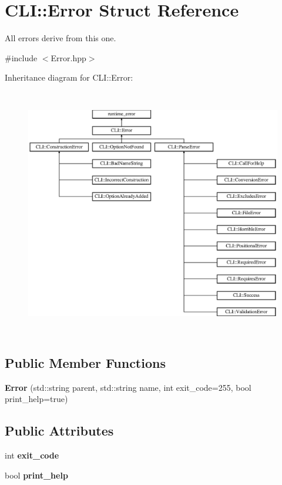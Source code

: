 \hypertarget{struct_c_l_i_1_1_error}{}\section{C\+LI\+:\+:Error Struct Reference}
\label{struct_c_l_i_1_1_error}


All errors derive from this one.  




{\ttfamily \#include $<$Error.\+hpp$>$}

Inheritance diagram for C\+LI\+:\+:Error\+:\begin{figure}[H]
\begin{center}
\leavevmode
\includegraphics[height=10.898204cm]{struct_c_l_i_1_1_error}
\end{center}
\end{figure}
\subsection*{Public Member Functions}
\begin{DoxyCompactItemize}
\item 
\mbox{\label{struct_c_l_i_1_1_error_a4a7d1df599d7b771bd46eb6f72221cc1}} 
{\bfseries Error} (std\+::string parent, std\+::string name, int exit\+\_\+code=255, bool print\+\_\+help=true)
\end{DoxyCompactItemize}
\subsection*{Public Attributes}
\begin{DoxyCompactItemize}
\item 
\mbox{\label{struct_c_l_i_1_1_error_ade74be0294e8a34fd8184b6c370b4b5e}} 
int {\bfseries exit\+\_\+code}
\item 
\mbox{\label{struct_c_l_i_1_1_error_a6300b3fff4116be33fe52730b575ec34}} 
bool {\bfseries print\+\_\+help}
\end{DoxyCompactItemize}


